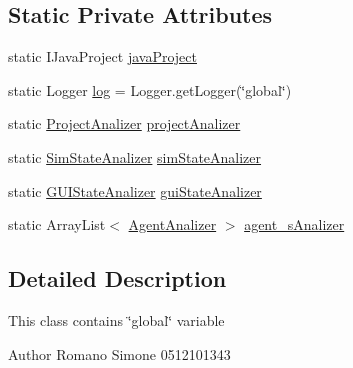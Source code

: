 \subsection*{Static Private Attributes}
\begin{DoxyCompactItemize}
\item 
static I\-Java\-Project \hyperlink{classit_1_1isislab_1_1masonassisteddocumentation_1_1mason_1_1analizer_1_1_global_utility_aba72c531253eef1bc593a95ab7935605}{java\-Project}
\item 
static Logger \hyperlink{classit_1_1isislab_1_1masonassisteddocumentation_1_1mason_1_1analizer_1_1_global_utility_afd0c78aa925e69d658bdd0ec85775ced}{log} = Logger.\-get\-Logger(\char`\"{}global\char`\"{})
\item 
static \hyperlink{classit_1_1isislab_1_1masonassisteddocumentation_1_1mason_1_1analizer_1_1_project_analizer}{Project\-Analizer} \hyperlink{classit_1_1isislab_1_1masonassisteddocumentation_1_1mason_1_1analizer_1_1_global_utility_a9a24c40baf312ee770f3b73d7a0dcfc4}{project\-Analizer}
\item 
static \hyperlink{classit_1_1isislab_1_1masonassisteddocumentation_1_1mason_1_1analizer_1_1_sim_state_analizer}{Sim\-State\-Analizer} \hyperlink{classit_1_1isislab_1_1masonassisteddocumentation_1_1mason_1_1analizer_1_1_global_utility_ad3cf75e2f354dae845d1a657be0d567d}{sim\-State\-Analizer}
\item 
static \hyperlink{classit_1_1isislab_1_1masonassisteddocumentation_1_1mason_1_1analizer_1_1_g_u_i_state_analizer}{G\-U\-I\-State\-Analizer} \hyperlink{classit_1_1isislab_1_1masonassisteddocumentation_1_1mason_1_1analizer_1_1_global_utility_a21d75c0d0c0cf2c10af5c0549175d5a0}{gui\-State\-Analizer}
\item 
static Array\-List$<$ \hyperlink{classit_1_1isislab_1_1masonassisteddocumentation_1_1mason_1_1analizer_1_1_agent_analizer}{Agent\-Analizer} $>$ \hyperlink{classit_1_1isislab_1_1masonassisteddocumentation_1_1mason_1_1analizer_1_1_global_utility_aad25923935f25b348200a005914af973}{agent\-\_\-s\-Analizer}
\end{DoxyCompactItemize}


\subsection{Detailed Description}
This class contains \char`\"{}global\char`\"{} variable \begin{DoxyAuthor}{Author}
Romano Simone 0512101343 
\end{DoxyAuthor}


